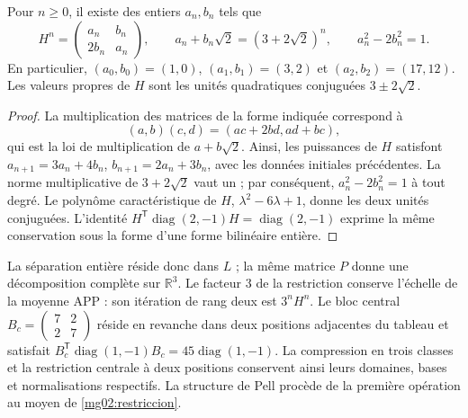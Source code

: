 \begin{corollary}
Pour \(n\geq0\), il existe des entiers \(a_n,b_n\) tels que
\begin{equation}
 H^n=\begin{pmatrix}a_n&b_n\\2b_n&a_n\end{pmatrix},\qquad
 a_n+b_n\sqrt2=(3+2\sqrt2)^n,
 \qquad a_n^2-2b_n^2=1.
 \label{mg02:pell}
\end{equation}
En particulier, \((a_0,b_0)=(1,0)\), \((a_1,b_1)=(3,2)\) et
\((a_2,b_2)=(17,12)\). Les valeurs propres de \(H\) sont les unités
quadratiques conjuguées \(3\pm2\sqrt2\).
\end{corollary}

\begin{proof}
La multiplication des matrices de la forme indiquée correspond à
\[
 (a,b)(c,d)=(ac+2bd,ad+bc),
\]
qui est la loi de multiplication de \(a+b\sqrt2\). Ainsi, les puissances
de \(H\) satisfont
\(a_{n+1}=3a_n+4b_n\), \(b_{n+1}=2a_n+3b_n\), avec les données
initiales précédentes. La norme multiplicative de \(3+2\sqrt2\) vaut
un ; par conséquent, \(a_n^2-2b_n^2=1\) à tout degré. Le polynôme
caractéristique de \(H\), \(\lambda^2-6\lambda+1\), donne les deux
unités conjuguées. L'identité
\(H^{\mathsf T}\operatorname{diag}(2,-1)H=
\operatorname{diag}(2,-1)\) exprime la même conservation sous la forme
d'une forme bilinéaire entière.
\end{proof}

La séparation entière réside donc dans \(L\) ; la même matrice \(P\) donne une décomposition complète sur \(\mathbb R^3\). Le facteur \(3\) de la restriction conserve l'échelle de la moyenne APP : son itération de rang deux est \(3^nH^n\). Le bloc central \(B_c=\left(\begin{smallmatrix}7&2\\2&7\end{smallmatrix}\right)\)
réside en revanche dans deux positions adjacentes du tableau et satisfait
\(B_c^{\mathsf T}\operatorname{diag}(1,-1)B_c=
45\operatorname{diag}(1,-1)\). La compression en trois classes et la
restriction centrale à deux positions conservent ainsi leurs domaines,
bases et normalisations respectifs. La structure de Pell procède de
la première opération au moyen de \eqref{mg02:restriccion}.
